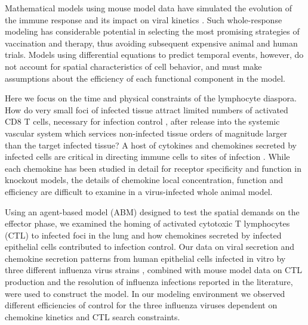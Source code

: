 \documentclass[10pt]{article}
\begin{document}
Mathematical models using mouse model data have simulated the evolution of the immune response and its impact on viral kinetics \cite{Handel2008, Lee2009, Miao2010, Handel2010, Wu2011}.  Such whole-response modeling has considerable potential in selecting the most promising strategies of vaccination and therapy, thus avoiding subsequent expensive animal and human trials.  Models using differential equations to predict temporal events, however, do not account for spatial characteristics of cell behavior, and must make assumptions about the efficiency of each functional component in the model. 

Here we focus on the time and physical constraints of the lymphocyte diaspora.  How do very small foci of infected tissue attract limited numbers of activated CD8 T cells, necessary for infection control \cite[Chapter 6]{Wormser2006a}\cite{Allan1990}, after release into the systemic vascular system which services non-infected tissue orders of magnitude larger than the target infected tissue?  A host of cytokines and chemokines secreted by infected cells are critical in directing immune cells to sites of infection \cite{Kawai1999, Sallusto2000, Zhao2000, Dufour2002, Thelen2008, Sigmundsdottir2008, Sallusto2008, Bromley2008, Kohlmeier2008}.  While each chemokine has been studied in detail for receptor specificity and function in knockout models, the details of chemokine local concentration, function and efficiency are difficult to examine in a virus-infected whole animal model.  

Using an agent-based model (ABM) designed to test the spatial demands on the effector phase, we examined the homing of activated cytotoxic T lymphocytes (CTL) to infected foci in the lung and how chemokines secreted by infected epithelial cells contributed to infection control.  Our data on viral secretion and chemokine secretion patterns from human epithelial cells infected in vitro by three different influenza virus strains \cite{Mitchell2011}, combined with mouse model data on CTL production and the resolution of influenza infections reported in the literature, were used to construct the model. In our modeling environment we observed different efficiencies of control for the three influenza viruses dependent on chemokine kinetics and CTL search constraints.
\end{document}
